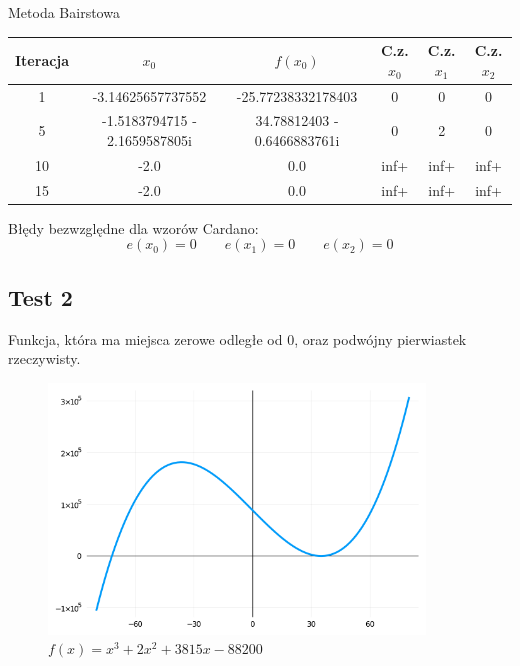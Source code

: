 \documentclass[a4paper]{article}
\begin{document}
    \vspace{5mm}

    \begin{center}
        Metoda Bairstowa
    \end{center}
    \begin{center}
        \begin{tabular}{|c|c|c|c|c|c|} 
            \hline
            Iteracja & $x_0$ & $f(x_0)$ & C.z. $x_0$ & C.z. $x_1$ & C.z. $x_2$ \\
            \hline
            1 & -3.14625657737552 & -25.77238332178403 & 0 & 0 & 0 \\ 
            \hline
            5 & -1.5183794715 - 2.1659587805i & 34.78812403 - 0.6466883761i & 0 & 2 & 0 \\ 
            \hline
            10 & -2.0 & 0.0 & inf+ & inf+ & inf+ \\
            \hline
            15 & -2.0 & 0.0 & inf+ & inf+ & inf+ \\
            \hline
        \end{tabular}
    \end{center}

    \vspace{5mm}

    \begin{center}
        Błędy bezwzględne dla wzorów Cardano:
        \[
            e(x_0) = 0 \qquad e(x_1) = 0 \qquad e(x_2) = 0  
        \]
    \end{center}

\newpage
\subsection{Test 2}
    Funkcja, która ma miejsca zerowe odległe od 0, oraz podwójny pierwiastek rzeczywisty.
    \begin{figure}[h]
        \centering
        \includegraphics[width=10cm]{2}
        \caption{$f(x) = x^3 + 2x^2 + 3815x - 88200$}
    \end{figure}
\end{document}
